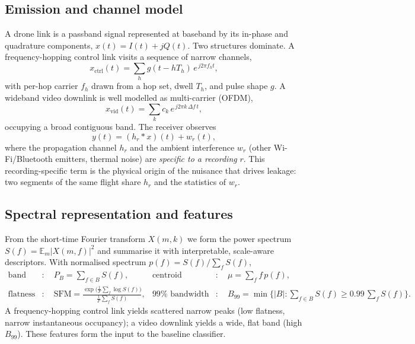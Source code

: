 \documentclass[11pt]{article}
\newcommand{\E}{\mathbb{E}}
\begin{document}
\subsection{Emission and channel model}
A drone link is a passband signal represented at baseband by its in-phase and quadrature components, $x(t)=I(t)+jQ(t)$. Two structures dominate. A frequency-hopping control link visits a sequence of narrow channels,
\begin{equation}
x_{\mathrm{ctrl}}(t)=\sum_{h} g\!\left(t-hT_h\right)\,e^{\,j2\pi f_h t},
\end{equation}
with per-hop carrier $f_h$ drawn from a hop set, dwell $T_h$, and pulse shape $g$. A wideband video downlink is well modelled as multi-carrier (OFDM),
\begin{equation}
x_{\mathrm{vid}}(t)=\sum_{k} c_k\,e^{\,j2\pi k\,\Delta f\,t},
\end{equation}
occupying a broad contiguous band. The receiver observes
\begin{equation}
y(t) = (h_r * x)(t) + w_r(t),
\end{equation}
where the propagation channel $h_r$ and the ambient interference $w_r$ (other Wi-Fi/Bluetooth emitters, thermal noise) are \emph{specific to a recording} $r$. This recording-specific term is the physical origin of the nuisance that drives leakage: two segments of the same flight share $h_r$ and the statistics of $w_r$.

\subsection{Spectral representation and features}
From the short-time Fourier transform $X(m,k)$ we form the power spectrum $S(f)=\E_m|X(m,f)|^2$ and summarise it with interpretable, scale-aware descriptors. With normalised spectrum $p(f)=S(f)/\sum_f S(f)$,
\begin{align}
\text{band power} &: \quad P_B=\textstyle\sum_{f\in B} S(f), &
\text{centroid} &: \quad \mu=\textstyle\sum_f f\,p(f),\\
\text{flatness} &: \quad \mathrm{SFM}=\frac{\exp\!\big(\frac{1}{F}\sum_f \log S(f)\big)}{\frac{1}{F}\sum_f S(f)}, &
\text{$99\%$ bandwidth} &: \quad B_{99}=\min\{|B|: \textstyle\sum_{f\in B}S(f)\ge 0.99\,\textstyle\sum_f S(f)\}.
\end{align}
A frequency-hopping control link yields scattered narrow peaks (low flatness, narrow instantaneous occupancy); a video downlink yields a wide, flat band (high $B_{99}$). These features form the input to the baseline classifier.
\end{document}
